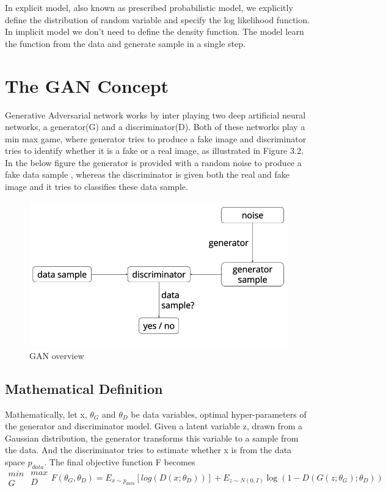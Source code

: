 In explicit model, also known as prescribed probabilistic model, we explicitly define the distribution of random variable and specify the log likelihood function.
In implicit model we don't need to define the density function\cite{1}. The model learn the function from the data and generate sample in a single step.

\section{The GAN  Concept}
Generative Adversarial network works by inter playing two deep artificial neural networks, a generator(G) and a discriminator(D). Both of these networks play a min max game, where generator tries to produce a fake image and discriminator tries to identify whether it is a fake or a real image, as illustrated in Figure 3.2. In the below figure the generator is provided with a random noise to produce a fake data sample , whereas the discriminator is given both the real and fake image and it tries to classifies these data sample.
\begin{figure}[t]

  \centering
    \includegraphics[scale=.4, angle=0]{Files/gan-overview.png}
    \caption[GAN overview]{ GAN overview\cite{Gan-overview}}
    \label{fig: GAN-Overview}
\end{figure}
\newpage
\subsection{Mathematical Definition}
Mathematically, let x,  $\theta_{G}$  and $\theta_{D}$ be data variables, optimal hyper-parameters of the generator and discriminator model.
Given a latent variable z, drawn from a Gaussian distribution, the generator transforms this variable to a sample from the data. And the discriminator tries to estimate whether x is from the data space $p_{data}$. The final objective function F becomes
$$ \substack{min\\ G} \substack{max\\ D} F (\theta_{G}, \theta_{D}) = E_{x\sim p_{data}} [log (D (x; \theta_{D}))] + E_{z\sim N(0,I)}\log (1- D(G (z; \theta_{G}) ; \theta_{D}))$$
